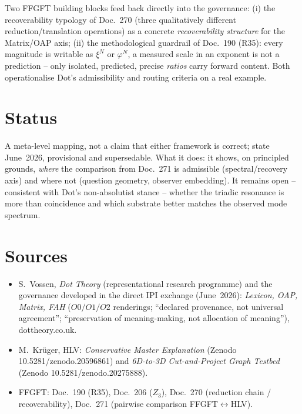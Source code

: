 Two FFGFT building blocks feed back directly into the governance: (i) the recoverability typology of Doc.~270
(three qualitatively different reduction/translation operations) as a concrete \emph{recoverability structure}
for the Matrix/OAP axis; (ii) the methodological guardrail of Doc.~190 (R35): every magnitude is writable as
$\xi^{N}$ or $\varphi^{N}$, a measured scale in an exponent is not a prediction -- only isolated, predicted,
precise \emph{ratios} carry forward content. Both operationalise Dot's admissibility and routing criteria on a
real example.

\section{Status}

A meta-level mapping, not a claim that either framework is correct; state June~2026, provisional and supersedable.
What it does: it shows, on principled grounds, \emph{where} the comparison from Doc.~271 is admissible
(spectral/recovery axis) and where not (question geometry, observer embedding). It remains open -- consistent with
Dot's non-absolutist stance -- whether the triadic resonance is more than coincidence and which substrate better
matches the observed mode spectrum.

\section{Sources}

\begin{itemize}
\item S.~Vossen, \emph{Dot Theory} (representational research programme) and the governance developed in the
direct IPI exchange (June~2026): \emph{Lexicon, OAP, Matrix, FAH} ($O0/O1/O2$ renderings; \enquote{declared
provenance, not universal agreement}; \enquote{preservation of meaning-making, not allocation of meaning}),
dottheory.co.uk.
\item M.~Krüger, HLV: \emph{Conservative Master Explanation} (Zenodo 10.5281/zenodo.20596861) and
\emph{6D-to-3D Cut-and-Project Graph Testbed} (Zenodo 10.5281/zenodo.20275888).
\item FFGFT: Doc.~190 (R35), Doc.~206 ($Z_3$), Doc.~270 (reduction chain / recoverability),
Doc.~271 (pairwise comparison FFGFT$\leftrightarrow$HLV).
\end{itemize}
